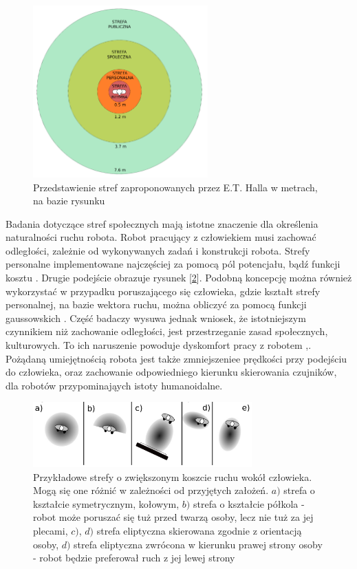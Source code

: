 \begin{figure}[H]
	\centering
	\includegraphics[width=0.6\textwidth]{gfx/882px-Personal_Spacepl.png}
	\caption{Przedstawienie stref zaproponowanych przez E.T. Halla w metrach, na bazie rysunku \cite{dimension_zones}}
	\label{fig:hall_zones}
\end{figure}

\indent Badania dotyczące stref społecznych mają istotne znaczenie dla określenia naturalności ruchu robota. Robot pracujący z człowiekiem musi zachować odległości, zależnie od wykonywanych zadań i konstrukcji robota. Strefy personalne implementowane najczęściej za pomocą pól potencjału, bądź funkcji kosztu \cite{survey}. Drugie podejście obrazuje rysunek [\ref{fig:cost_zones}]. Podobną koncepcję można również wykorzystać w przypadku poruszającego się człowieka, gdzie kształt strefy personalnej, na bazie wektora ruchu, można obliczyć za pomocą funkcji gaussowskich\cite{nrs} \cite{gauss_2}. Część badaczy wysuwa jednak wniosek, że istotniejszym czynnikiem niż zachowanie odległości, jest przestrzeganie zasad społecznych, kulturowych. To ich naruszenie powoduje dyskomfort pracy z robotem \cite{survey},\cite{survey_2}. Pożądaną umiejętnością robota jest także zmniejszeniee prędkości przy podejściu do człowieka, oraz zachowanie odpowiedniego kierunku skierowania czujników, dla robotów przypominająych istoty humanoidalne.

\begin{figure}[H]
	\centering
	\includegraphics[width=0.75\textwidth]{gfx/cost_zone.png}
	\caption{Przykładowe strefy o zwiększonym koszcie ruchu wokół człowieka. Mogą się one różnić w zależności od przyjętych założeń\cite{survey}. $a)$ strefa o kształcie symetrycznym, kołowym, $b)$ strefa o kształcie półkola - robot może poruszać się tuż przed twarzą osoby, lecz nie tuż za jej plecami, $c)$, $d)$ strefa eliptyczna skierowana zgodnie z orientacją osoby, $d)$ strefa eliptyczna zwrócona w kierunku prawej strony osoby - robot będzie preferował ruch z jej lewej strony }
	\label{fig:cost_zones}
\end{figure}

